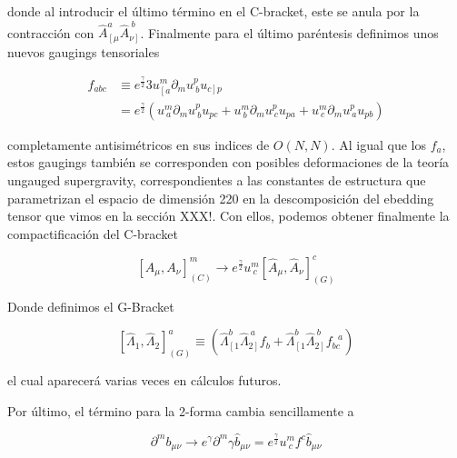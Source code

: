 \documentclass{article}
\numberwithin{equation}{section}
\begin{document}
donde al introducir el último término en el C-bracket, este se anula por la contracción con $ \hat{A}_{\left[\mu \right.}^a \hat{A}_{\left. \nu\right]}^{\ b} $. Finalmente para el último paréntesis definimos unos nuevos gaugings tensoriales 

\begin{equation}
\begin{aligned}
f_{a b c} &\equiv e^{\frac{\gamma}{2}}3 u^{m}_{\left[ a\right.} \partial_m u^{p}_{\ b} u_{\left. c\right] p }\\
&= e^{\frac{\gamma}{2}} \left(u^{m}_{ \ a} \partial_m u^{p}_{\ b} u_{ p c} + u^{m}_{ \ b} \partial_m u^{p}_{\ c} u_{ p a} + u^{m}_{ \ c} \partial_m u^{p}_{\ a} u_{ p b}\right)
\end{aligned}
\end{equation}

completamente antisimétricos en sus indices de $ O(N,N) $. Al igual que los $ f_a $, estos gaugings también se corresponden con posibles deformaciones de la teoría ungauged supergravity, correspondientes a las constantes de estructura que parametrizan el espacio de dimensión 220 en la descomposición del ebedding tensor que vimos en la sección XXX!. Con ellos, podemos obtener finalmente la compactificación del C-bracket

\begin{equation}\label{CbrackethatAA}
\left[A_{\mu}, A_{\nu} \right]_{(C)}^{m} \longrightarrow e^{\frac{\gamma}{2}} u^m_{\ c} \left[ \hat{A}_{\mu}, \hat{A}_{\nu} \right]^c_{(G)}
\end{equation}

Donde definimos el G-Bracket

\begin{boxeq}
	\begin{equation}\label{Gbracket}
	\left[ \hat{\Lambda}_1, \hat{\Lambda}_2 \right]^a_{(G)} \equiv \left( \hat{\Lambda}_{\left[1 \right.}^b \hat{\Lambda}_{\left. 2\right]}^{\ a} f_b + \hat{\Lambda}_{\left[1 \right.}^b \hat{\Lambda}_{\left. 2\right]}^{\ b}  f_{b c}^{\ \ \ a}\right)
	\end{equation} 
\end{boxeq}

el cual aparecerá varias veces en cálculos futuros.

Por último, el término para la 2-forma cambia sencillamente a

\begin{equation}\label{hatderivadab}
\partial^m b_{\mu \nu} \longrightarrow e^{\gamma} \partial^{m}\gamma \hat{b}_{\mu \nu} = e^{\frac{\gamma}{2}} u^{m}_{\ c} f^c \hat{b}_{\mu \nu}
\end{equation}
\end{document}
